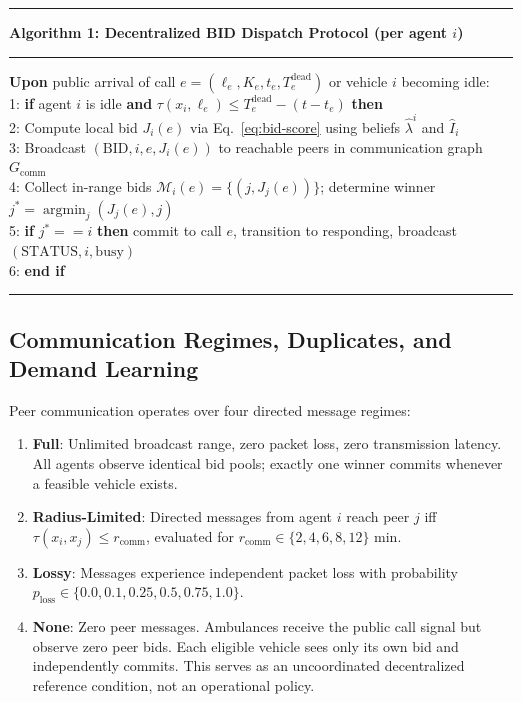 \documentclass{article}
\begin{document}
\begin{center}
\begin{minipage}{0.96\linewidth}
\hrule\vspace{2pt}
\textbf{Algorithm 1: Decentralized BID Dispatch Protocol (per agent $i$)}
\vspace{2pt}\hrule\vspace{2pt}
\scriptsize
\textbf{Upon} public arrival of call $e = (\ell_e, K_e, t_e, T_e^{\mathrm{dead}})$ or vehicle $i$ becoming idle:\\
1: \textbf{if} agent $i$ is idle \textbf{and} $\tau(x_i, \ell_e) \le T_e^{\mathrm{dead}} - (t - t_e)$ \textbf{then}\\
2: \quad Compute local bid $J_i(e)$ via Eq.~\eqref{eq:bid-score} using beliefs $\widehat{\lambda}^i$ and $\widehat{I}_i$\\
3: \quad Broadcast $(\text{BID}, i, e, J_i(e))$ to reachable peers in communication graph $G_{\mathrm{comm}}$\\
4: \quad Collect in-range bids $\mathcal{M}_i(e) = \{(j, J_j(e))\}$; determine winner $j^* = \operatorname{argmin}_{j} (J_j(e), j)$\\
5: \quad \textbf{if} $j^* == i$ \textbf{then} commit to call $e$, transition to responding, broadcast $(\text{STATUS}, i, \text{busy})$\\
6: \textbf{end if}
\vspace{1pt}\hrule
\end{minipage}
\end{center}

\subsection{Communication Regimes, Duplicates, and Demand Learning}
Peer communication operates over four directed message regimes:
\begin{enumerate}\itemsep1pt
\item \textbf{Full}: Unlimited broadcast range, zero packet loss, zero transmission latency. All agents observe identical bid pools; exactly one winner commits whenever a feasible vehicle exists.
\item \textbf{Radius-Limited}: Directed messages from agent $i$ reach peer $j$ iff $\tau(x_i, x_j) \le r_{\mathrm{comm}}$, evaluated for $r_{\mathrm{comm}} \in \{2, 4, 6, 8, 12\}$ min.
\item \textbf{Lossy}: Messages experience independent packet loss with probability $p_{\mathrm{loss}} \in \{0.0, 0.1, 0.25, 0.5, 0.75, 1.0\}$.
\item \textbf{None}: Zero peer messages. Ambulances receive the public call signal but observe zero peer bids. Each eligible vehicle sees only its own bid and independently commits. This serves as an uncoordinated decentralized reference condition, not an operational policy.
\end{enumerate}
\end{document}

